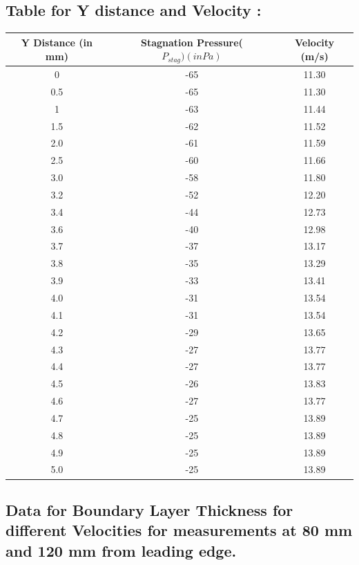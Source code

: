 \documentclass[12pt,a4paper]{article}
\begin{document}
\subsection{Table for Y distance and Velocity :}
\begin{table}[ht]
\centering
\vspace{2mm}
\begin{tabular}{|c|c|c|} 
 \hline
Y Distance (in mm) & Stagnation Pressure($P_{stag})(in Pa)$ &  Velocity (m/s) \\ 
 \hline
 0 & -65 & 11.30 \\
 \hline
0.5 & -65 & 11.30 \\ 
 \hline
 1 & -63 & 11.44 \\
 \hline
1.5 & -62 & 11.52  \\
 \hline
2.0 & -61 & 11.59 \\
 \hline
2.5 & -60 & 11.66 \\ 
 \hline
3.0 & -58 & 11.80 \\ 
 \hline
 3.2 & -52 & 12.20 \\
 \hline
3.4 & -44 & 12.73  \\
 \hline
3.6 & -40 & 12.98 \\
 \hline
3.7 & -37 & 13.17 \\ 
 \hline 
3.8 & -35 & 13.29 \\
 \hline
3.9 & -33 & 13.41 \\ 
 \hline
4.0 & -31 & 13.54 \\
 \hline
4.1 & -31 & 13.54 \\ 
 \hline
4.2 & -29 & 13.65 \\
 \hline
4.3 & -27 & 13.77  \\
 \hline
4.4 & -27 & 13.77 \\
 \hline
4.5 & -26 & 13.83 \\ 
 \hline 
4.6 & -27 & 13.77 \\ 
 \hline
4.7 & -25 & 13.89 \\
 \hline
4.8 & -25 & 13.89  \\
 \hline
4.9 & -25 & 13.89 \\
 \hline
5.0 & -25 & 13.89 \\ 
 \hline 
 \end{tabular}
\end{table}

 \subsection{Data for Boundary Layer Thickness for different Velocities for measurements at 80 mm and 120 mm from leading edge.}
\end{document}
